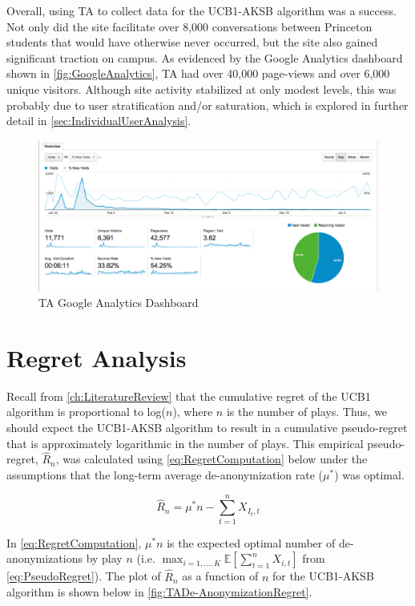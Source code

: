 Overall, using TA to collect data for the UCB1-AKSB algorithm was a success. Not only did the site facilitate over 8,000 conversations between Princeton students that would have otherwise never occurred, but the site also gained significant traction on campus. As evidenced by the Google Analytics dashboard shown in \autoref{fig:GoogleAnalytics}, TA had over 40,000 page-views and over 6,000 unique visitors. Although site activity stabilized at only modest levels, this was probably due to user stratification and/or saturation, which is explored in further detail in \autoref{sec:IndividualUserAnalysis}.

\begin{figure}[H]
\centering
\includegraphics[trim= 0mm 0mm 0mm 0mm, clip, scale=0.3]{./Figures/GoogleAnalytics}
\caption{TA Google Analytics Dashboard}
\label{fig:GoogleAnalytics}
\end{figure}

\section{Regret Analysis}
\label{sec:RegretAnalysis}

Recall from \autoref{ch:LiteratureReview} that the cumulative regret of the UCB1 algorithm is proportional to log($n$), where $n$ is the number of plays. Thus, we should expect the UCB1-AKSB algorithm to result in a cumulative pseudo-regret that is approximately logarithmic in the number of plays. This empirical pseudo-regret, $\hat{R}_n$, was calculated using \autoref{eq:RegretComputation} below under the assumptions that the long-term average de-anonymization rate ($\mu^{*}$) was optimal.

\begin{equation}
\label{eq:RegretComputation}
\hat{R}_n = \mu^{*}n - \sum_{t=1}^{n}{X_{I_t, t}}
\end{equation}

In \autoref{eq:RegretComputation}, $\mu^{*}n$ is the expected optimal number of de-anonymizations by play $n$ (i.e. $\max_{i=1,...,K}{\mathbb{E}\left[\sum_{t=1}^{n}{X_{i, t}}\right]}$ from \autoref{eq:PseudoRegret}). The plot of $\hat{R}_n$ as a function of $n$ for the UCB1-AKSB algorithm is shown below in \autoref{fig:TADe-AnonymizationRegret}.

